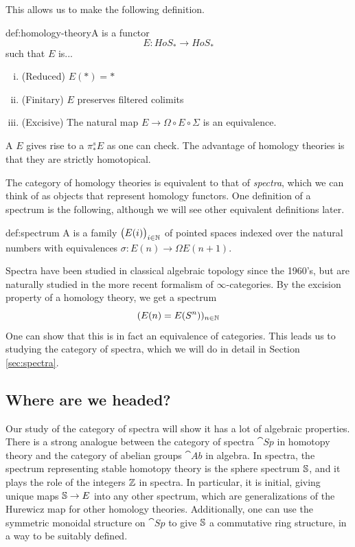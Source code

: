 This allows us to make the following definition.

\begin{definition}{def:homology-theory}A  is a functor
$$E:HoS_*\rightarrow HoS_*$$
such that $E$ is...
\begin{enumerate}[(i)]
\item (Reduced) $E(*)=*$
\item (Finitary) $E$ preserves filtered colimits
\item (Excisive) The natural map $E\rightarrow \Omega\circ E\circ \Sigma$ is an equivalence.
\end{enumerate} \end{definition}

A  $E$ gives rise to a  $\pi_*^sE$ as one can check. %
The advantage of homology theories is that they are strictly homotopical.

The category of homology theories is equivalent to that of \textit{spectra}, which we can think of as objects that represent homology functors. One definition of a spectrum is the following, although we will see other equivalent definitions later.
\begin{definition}{def:spectrum}
A  is a family $\big(E(i)\big)_{i\in \mathbb{N}}$ of pointed spaces indexed over the natural numbers with equivalences
$\sigma:E(n)\rightarrow \Omega E(n+1)$. 
\end{definition}
Spectra have been studied in classical algebraic topology since the 1960's, but are naturally studied in the more recent formalism of $\infty$-categories. By the excision property of a homology theory, we get a spectrum
$$(E(n)=E(S^n))_{n\in \mathbb{N}}$$ One can show that this is in fact an equivalence of categories. This leads us to studying the category of spectra, which we will do in detail in Section \ref{sec:spectra}.

\subsection{Where are we headed?}\label{sec:where-are-we-headed}
Our study of the category of spectra will show it has a lot of algebraic properties. There is a strong analogue between the category of spectra $\cat{Sp}$ in homotopy theory and the category of abelian groups $\cat{Ab}$ in algebra. In spectra, the spectrum representing stable homotopy theory is the sphere spectrum $\mathbb{S}$, and it plays the role of the integers $\mathbb{Z}$ in spectra. In particular, it is initial, giving unique maps $\mathbb{S}\rightarrow E$ into any other spectrum, which are generalizations of the Hurewicz map for other homology theories. Additionally, one can use the symmetric monoidal structure on $\cat{Sp}$ to give $\mathbb{S}$ a commutative ring structure, in a way to be suitably defined. 

